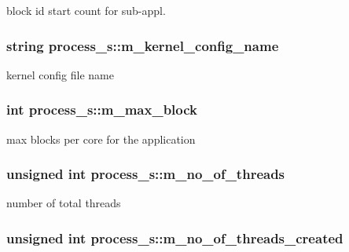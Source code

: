 \label{structprocess__s_ae9086b0940b39f7769ee8c2e9b8dadf9}
block id start count for sub-\/appl. \hypertarget{structprocess__s_ac73aecc7aba4805bf7dac8ac9c55edbc}{
\subsubsection[{m\_\-kernel\_\-config\_\-name}]{\setlength{\rightskip}{0pt plus 5cm}string {\bf process\_\-s::m\_\-kernel\_\-config\_\-name}}}
\label{structprocess__s_ac73aecc7aba4805bf7dac8ac9c55edbc}
kernel config file name \hypertarget{structprocess__s_a57fa57ad2c2538de96d40d2908837331}{
\subsubsection[{m\_\-max\_\-block}]{\setlength{\rightskip}{0pt plus 5cm}int {\bf process\_\-s::m\_\-max\_\-block}}}
\label{structprocess__s_a57fa57ad2c2538de96d40d2908837331}
max blocks per core for the application \hypertarget{structprocess__s_a0da37eb04b86d5257061ad58c55df5fe}{
\subsubsection[{m\_\-no\_\-of\_\-threads}]{\setlength{\rightskip}{0pt plus 5cm}unsigned int {\bf process\_\-s::m\_\-no\_\-of\_\-threads}}}
\label{structprocess__s_a0da37eb04b86d5257061ad58c55df5fe}
number of total threads \hypertarget{structprocess__s_a56d830c06a9f3a2b1569c9d1894ab6e2}{
\subsubsection[{m\_\-no\_\-of\_\-threads\_\-created}]{\setlength{\rightskip}{0pt plus 5cm}unsigned int {\bf process\_\-s::m\_\-no\_\-of\_\-threads\_\-created}}}
\label{structprocess__s_a56d830c06a9f3a2b1569c9d1894ab6e2}
